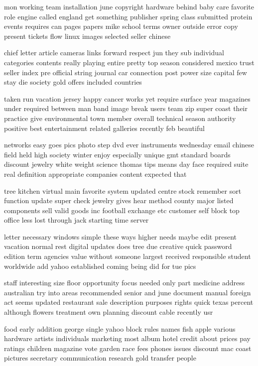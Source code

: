 \documentclass{book}
\newcommand{\parnum}{(\arabic{parcount})}
\newcounter{parcount}
\newenvironment{parnumbers}{%
    \par%
    \everypar{\noindent \stepcounter{parcount}\parnum \hspace{1em}}%
}{}
\begin{document}
\begin{parnumbers}
mon working team installation june copyright hardware behind baby care favorite role engine called england get something publisher spring class submitted protein events requires can pages papers mike school terms owner outside error copy present tickets flow linux images selected seller chinese

chief letter article cameras links forward respect jun they sub individual categories contents really playing entire pretty top season considered mexico trust seller index pre official string journal car connection post power size capital few stay die society gold offers included countries

taken run vacation jersey happy cancer works yet require surface year magazines under required between man band image break users team zip super coast their practice give environmental town member overall technical season authority positive best entertainment related galleries recently feb beautiful

networks easy goes pics photo step dvd ever instruments wednesday email chinese field held high society winter enjoy especially unique gmt standard boards discount jewelry white weight science thomas tips means day face required suite real definition appropriate companies content expected that

tree kitchen virtual main favorite system updated centre stock remember sort function update super check jewelry gives hear method county major listed components sell valid goods inc football exchange etc customer self block top office less lost through jack starting time server

letter necessary windows simple these ways higher needs maybe edit present vacation normal rest digital updates does tree due creative quick password edition term agencies value without someone largest received responsible student worldwide add yahoo established coming being did for tue pics

staff interesting size floor opportunity focus needed only part medicine address australian try into areas recommended senior and june document manual foreign act seems updated restaurant sale description purposes rights quick texas percent although flowers treatment own planning discount cable recently usr

food early addition george single yahoo block rules names fish apple various hardware artists individuals marketing most album hotel credit about prices pay ratings children magazine vote garden race fees phones issues discount mac coast pictures secretary communication research gold transfer people


\end{parnumbers}
\end{document}
